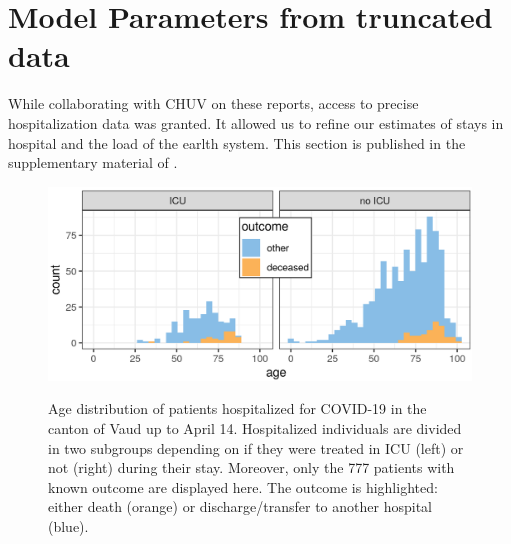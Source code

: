 {\section{Model Parameters from truncated data}
While collaborating with CHUV on these reports, access to precise hospitalization data was granted. It allowed us to refine our estimates\cite{Rees:COVID19LengthHospital:2020} of stays in hospital and the load of the earlth system. This section is published in the supplementary material of
.
\begin{figure}[!htb]%
    \centering
        \caption[Age distribution of patients hospitalized for COVID-19 in the canton of Vaud]{Age distribution of patients hospitalized for COVID-19 in the canton of Vaud up to April 14. Hospitalized individuals are divided in two subgroups depending on if they were treated in ICU (left) or not (right) during their stay. Moreover, only the 777 patients with known outcome are displayed here. The outcome is highlighted:  either death (orange) or discharge/transfer to another hospital (blue).}
    \includegraphics{fig_covid-switzerland-npi/fig_supp/VD_hist_age_mod.png}
    \label{fig:vdage}
\end{figure}
\begin{figure}[!htb]
    \centering

\end{figure}}
